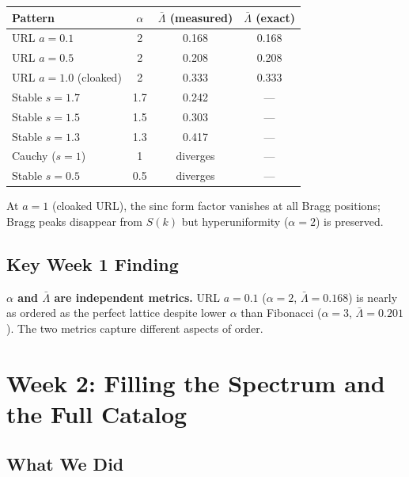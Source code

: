 \documentclass[11pt,letterpaper]{article}
\begin{document}
\begin{table}[H]\centering
\begin{tabular}{lccc}
\toprule
\textbf{Pattern} & $\alpha$ & $\bar\Lambda$ (measured) & $\bar\Lambda$ (exact) \\
\midrule
URL $a=0.1$ & 2 & 0.168 & 0.168 \\
URL $a=0.5$ & 2 & 0.208 & 0.208 \\
URL $a=1.0$ (cloaked) & 2 & 0.333 & 0.333 \\
\midrule
Stable $s=1.7$ & 1.7 & 0.242 & --- \\
Stable $s=1.5$ & 1.5 & 0.303 & --- \\
Stable $s=1.3$ & 1.3 & 0.417 & --- \\
Cauchy ($s=1$) & 1   & diverges & --- \\
Stable $s=0.5$ & 0.5 & diverges & --- \\
\bottomrule
\end{tabular}
\end{table}

At $a=1$ (cloaked URL), the sinc form factor vanishes at all Bragg positions;
Bragg peaks disappear from $S(k)$ but hyperuniformity ($\alpha=2$) is preserved.

\subsection{Key Week 1 Finding}
\textbf{$\alpha$ and $\bar\Lambda$ are independent metrics.}
URL $a=0.1$ ($\alpha=2$, $\bar\Lambda=0.168$) is nearly as ordered as the perfect lattice
despite lower $\alpha$ than Fibonacci ($\alpha=3$, $\bar\Lambda=0.201$).
The two metrics capture different aspects of order.

\section{Week 2: Filling the Spectrum and the Full Catalog}

\subsection{What We Did}
\end{document}
